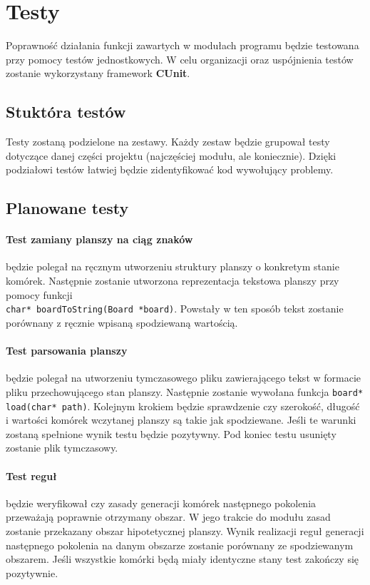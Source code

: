 \documentclass{article}
\begin{document}
\section{Testy}
Poprawność działania funkcji zawartych w modułach programu będzie testowana przy pomocy testów jednostkowych. W celu organizacji oraz uspójnienia testów zostanie wykorzystany framework \textbf{CUnit}.

\subsection{Stuktóra testów}
Testy zostaną podzielone na zestawy. Każdy zestaw będzie grupował testy dotyczące danej części projektu (najczęściej modułu, ale koniecznie). Dzięki podziałowi testów łatwiej będzie zidentyfikować kod wywołujący problemy.

\subsection{Planowane testy}

\paragraph{Test zamiany planszy na ciąg znaków} będzie polegał na ręcznym utworzeniu struktury planszy o konkretym stanie komórek. Następnie zostanie utworzona reprezentacja tekstowa planszy przy pomocy funkcji \\ \texttt{char* boardToString(Board *board)}. Powstały w ten sposób tekst zostanie porównany z ręcznie wpisaną spodziewaną wartością.

\paragraph{Test parsowania planszy} będzie polegał na utworzeniu tymczasowego pliku zawierającego tekst w formacie pliku przechowującego stan planszy. Następnie zostanie wywołana funkcja \texttt{board* load(char* path)}. Kolejnym krokiem będzie sprawdzenie czy szerokość, długość i wartości komórek wczytanej planszy są takie jak spodziewane. Jeśli te warunki zostaną spełnione wynik testu będzie pozytywny. Pod koniec testu usunięty zostanie plik tymczasowy.

\paragraph{Test reguł} będzie weryfikował czy zasady generacji komórek następnego pokolenia przeważają poprawnie otrzymany obszar. W jego trakcie do modułu zasad zostanie przekazany obszar hipotetycznej planszy. Wynik realizacji reguł generacji następnego pokolenia na danym obszarze zostanie porównany ze spodziewanym obszarem. Jeśli wszystkie komórki będą miały identyczne stany test zakończy się pozytywnie.
\end{document}
